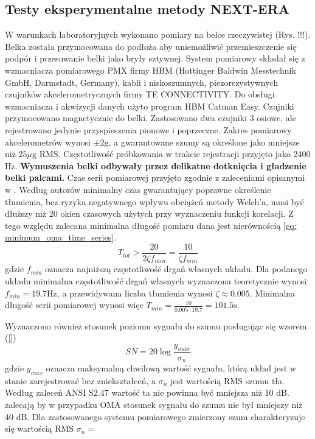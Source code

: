\subsection{Testy eksperymentalne metody NEXT-ERA} \label{sect: next_era_lab_test}
W warunkach laboratoryjnych wykonano pomiary na belce rzeczywistej (Rys. !!!). Belka została przymocowana do podłoża aby uniemożliwić przemieszczenie się podpór i przesuwanie belki jako bryły sztywnej. System pomiarowy składał się z wzmacniacza pomiarowego PMX firmy HBM (Hottinger Baldwin Messtechnik GmbH, Darmstadt, Germany), kabli i niskoszumnych, piezorezystywnych czujników akcelerometrycznych firmy TE CONNECTIVITY. Do obsługi wzmacniacza i akwizycji danych użyto program HBM Catman Easy. Czujniki przymocowano magnetycznie do belki. Zastosowano dwa czujniki 3 osiowe, ale rejestrowano jedynie przyspieszenia pionowe i poprzeczne. Zakres pomiarowy akcelerometrów wynosi $\pm 2 \text{g}$, a gwarantowane szumy są określone jako mniejsze niż $25\mu \text{g RMS}$. Częstotliwość próbkowania w trakcie rejestracji przyjęto jako 2400 Hz. \textbf{Wymuszenia belki odbywały przez delikatne dotknięcia i gładzenie belki palcami.} Czas serii pomiarowej przyjęto zgodnie z zaleceniami opisanymi w \cite{Brincker2015}. Według autorów minimalny czas gwarantujący poprawne określenie tłumienia, bez ryzyka negatywnego wpływu obciążeń metody Welch'a, musi być dłuższy niż 20 okien czasowych użytych przy wyznaczeniu funkcji korelacji. Z tego względu zalecana minimalna długość pomiaru dana jest nierównością \ref{eq: minimum_oma_time_series}.
\begin{equation} \label{eq: minimum_oma_time_series}
	T_{tot} > \frac{20}{2\zeta f_{min}}=\frac{10}{\zeta f_{min}}
\end{equation}
gdzie $f_{min}$ oznacza najniższą częstotliwość drgań własnych układu. Dla podanego układu minimalna częstotliwość drgań własnych wyznaczona teoretycznie wynosi $f_{min}=19.7 \text{Hz}$, a przewidywana liczba tłumienia wynosi $\zeta \approx 0.005$. Minimalna długość serii pomiarowej wynosi więc $T_{min} = \frac{10}{0.005\cdot 19.7} = 101.5 \text{s}$. 

Wyznaczono również stosunek poziomu sygnału do szumu posługując się wzorem (\ref{})
\begin{equation}
	SN = 20 \log{\frac{y_{max}}{\sigma_n}}
\end{equation}
gdzie $y_{max}$ oznacza maksymalną chwilową wartość sygnału, którą układ jest w stanie zarejestrować bez zniekształceń, a $\sigma_n$ jest wartością RMS szumu tła. Według zaleceń ANSI S2.47 wartość ta nie powinna być mniejsza niż 10 dB. \cite{Brincker2015} zalecają by w przypadku OMA stosunek sygnału do szumu nie był mniejszy niż 40 dB. Dla zastosowanego systemu pomiarowego zmierzony szum charakteryzuje się wartością RMS $\sigma_n = $

